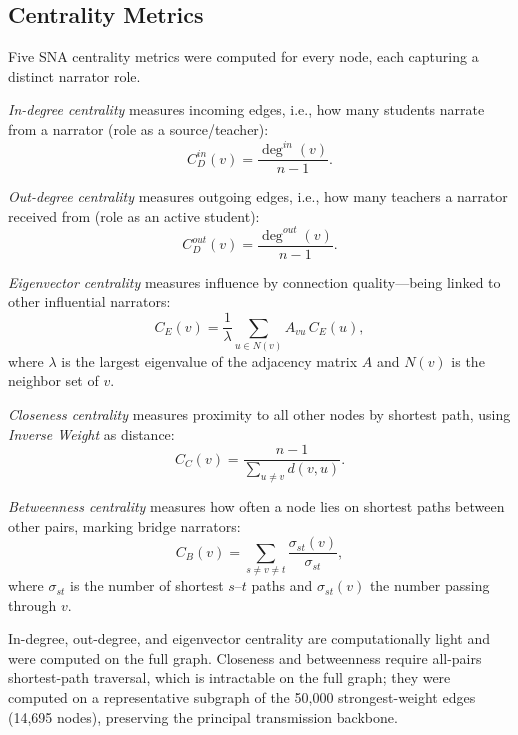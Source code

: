 \documentclass[conference]{IEEEtran}
\begin{document}
\subsection{Centrality Metrics}

Five SNA centrality metrics \cite{Mamatha2024} were computed for every node, each
capturing a distinct narrator role.

\textit{In-degree centrality} measures incoming edges, i.e., how many students
narrate from a narrator (role as a source/teacher):
\begin{equation}
C_D^{in}(v) = \frac{\deg^{in}(v)}{n-1}.
\label{eq:indeg}
\end{equation}

\textit{Out-degree centrality} measures outgoing edges, i.e., how many teachers a
narrator received from (role as an active student):
\begin{equation}
C_D^{out}(v) = \frac{\deg^{out}(v)}{n-1}.
\label{eq:outdeg}
\end{equation}

\textit{Eigenvector centrality} measures influence by connection quality---being
linked to other influential narrators:
\begin{equation}
C_E(v) = \frac{1}{\lambda} \sum_{u \in N(v)} A_{vu}\, C_E(u),
\label{eq:eig}
\end{equation}
where $\lambda$ is the largest eigenvalue of the adjacency matrix $A$ and $N(v)$
is the neighbor set of $v$.

\textit{Closeness centrality} measures proximity to all other nodes by shortest
path, using \textit{Inverse Weight} as distance:
\begin{equation}
C_C(v) = \frac{n-1}{\displaystyle\sum_{u \neq v} d(v,u)}.
\label{eq:close}
\end{equation}

\textit{Betweenness centrality} measures how often a node lies on shortest paths
between other pairs, marking bridge narrators:
\begin{equation}
C_B(v) = \sum_{s \neq v \neq t} \frac{\sigma_{st}(v)}{\sigma_{st}},
\label{eq:betw}
\end{equation}
where $\sigma_{st}$ is the number of shortest $s$--$t$ paths and
$\sigma_{st}(v)$ the number passing through $v$.

In-degree, out-degree, and eigenvector centrality are computationally light and
were computed on the full graph. Closeness and betweenness require all-pairs
shortest-path traversal, which is intractable on the full graph; they were
computed on a representative subgraph of the 50{,}000 strongest-weight edges
(14{,}695 nodes), preserving the principal transmission backbone.
\end{document}
